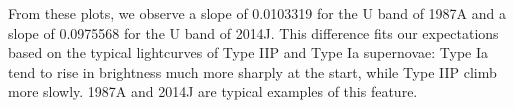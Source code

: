 From these plots, we observe a slope of 0.0103319 for the U band of 1987A and a slope of 0.0975568 for the U band of 2014J. This difference fits our expectations based on the typical lightcurves of Type IIP and Type Ia supernovae: Type Ia tend to rise in brightness much more sharply at the start, while Type IIP climb more slowly. 1987A and 2014J are typical examples of this feature.


